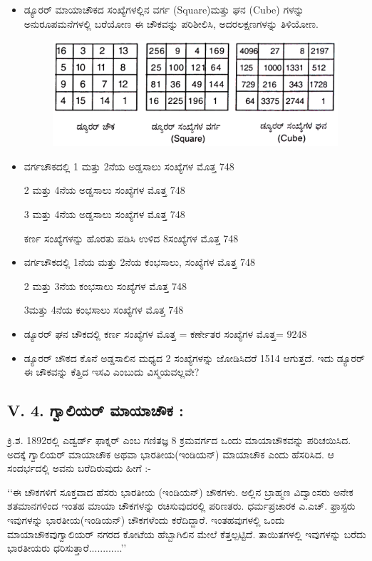 \begin{itemize}
	\item ಡ್ಯೂರರ್ ಮಾಯಾಚೌಕದ ಸಂಖ್ಯೆಗಳಲ್ಲಿನ ವರ್ಗ (Square)ಮತ್ತು ಘನ (Cube) ಗಳನ್ನು ಅನುರೂಪಮನೆಗಳಲ್ಲಿ ಬರೆಯೋಣ
	ಈ ಚೌಕವನ್ನು ಪರಿಶೀಲಿಸಿ, ಅದರ\break ಲಕ್ಷಣಗಳನ್ನು ತಿಳಿಯೋಣ.
	\begin{figure}[H]
	\includegraphics[scale=.8]{src/figures/chap4/fig4.20.jpg}
	\end{figure}

	\item ವರ್ಗಚೌಕದಲ್ಲಿ 1 ಮತ್ತು 2ನೆಯ ಅಡ್ಡಸಾಲು ಸಂಖ್ಯೆಗಳ ಮೊತ್ತ 748

	2 ಮತ್ತು 4ನೆಯ ಅಡ್ಡಸಾಲು ಸಂಖ್ಯೆಗಳ ಮೊತ್ತ 748

	3 ಮತ್ತು 4ನೆಯ ಅಡ್ಡಸಾಲು ಸಂಖ್ಯೆಗಳ ಮೊತ್ತ 748

	ಕರ್ಣ ಸಂಖ್ಯೆಗಳನ್ನು ಹೊರತು ಪಡಿಸಿ ಉಳಿದ 8ಸಂಖ್ಯೆಗಳ ಮೊತ್ತ 748
	
	\item ವರ್ಗಚೌಕದಲ್ಲಿ 1ನೆಯ ಮತ್ತು 2ನೆಯ ಕಂಭಸಾಲು, ಸಂಖ್ಯೆಗಳ ಮೊತ್ತ 748

	2 ಮತ್ತು 3ನೆಯ ಕಂಭಸಾಲು ಸಂಖ್ಯೆಗಳ ಮೊತ್ತ 748

	3ಮತ್ತು 4ನೆಯ ಕಂಭಸಾಲು ಸಂಖ್ಯೆಗಳ ಮೊತ್ತ 748
	\item ಡ್ಯೂರರ್ ಘನ ಚೌಕದಲ್ಲಿ ಕರ್ಣ ಸಂಖ್ಯೆಗಳ ಮೊತ್ತ = ಕರ್ಣೇತರ ಸಂಖ್ಯೆಗಳ ಮೊತ್ತ= 9248

	\item ಡ್ಯೂರರ್ ಚೌಕದ ಕೊನೆ ಅಡ್ಡಸಾಲಿನ ಮಧ್ಯದ 2 ಸಂಖ್ಯೆಗಳನ್ನು ಜೋಡಿಸಿದರೆ 1514 ಆಗುತ್ತದೆ. ಇದು ಡ್ಯೂರರ್ ಈ ಚೌಕವನ್ನು ಕೆತ್ತಿದ ಇಸವಿ ಎಂಬುದು ವಿಸ್ಮಯ\-ವಲ್ಲವೇ?
\end{itemize}

\subsection*{V. 4. ಗ್ವಾಲಿಯರ್ ಮಾಯಾಚೌಕ :}

ಕ್ರಿ.ಶ. 1892ರಲ್ಲಿ ಎಡ್ವರ್ಡ್ ಫಾಕ್ನರ್ ಎಂಬ ಗಣಿತಜ್ಞ 8 ಕ್ರಮವರ್ಗದ ಒಂದು ಮಾಯಾಚೌಕ\-ವನ್ನು ಪರಿಚಯಿಸಿದ. ಅದಕ್ಕೆ ಗ್ವಾಲಿಯರ್ ಮಾಯಾಚೌಕ ಅಥವಾ ಭಾರತೀಯ(ಇಂಡಿಯನ್) ಮಾಯಾಚೌಕ ಎಂದು ಹೆಸರಿಸಿದ. ಆ ಸಂದರ್ಭದಲ್ಲಿ ಅವನು ಬರೆದಿರುವುದು ಹೀಗೆ :-

‘‘ಈ ಚೌಕಗಳಿಗೆ ಸೂಕ್ತವಾದ ಹೆಸರು ಭಾರತೀಯ (ಇಂಡಿಯನ್) ಚೌಕಗಳು. ಅಲ್ಲಿನ ಬ್ರಾಹ್ಮಣ ವಿದ್ವಾಂಸರು ಅನೇಕ ಶತಮಾನಗಳಿಂದ ಇಂತಹ ಮಾಯಾ ಚೌಕಗಳನ್ನು ರಚಿಸು\-ವುದರಲ್ಲಿ ಪರಿಣತರು. ಧರ್ಮಪ್ರಚಾರಕ ಎ.ಎಚ್. ಫ್ರಾಸ್ಟರು ಇವುಗಳನ್ನು ಭಾರತೀಯ\break (ಇಂಡಿಯನ್) ಚೌಕಗಳೆಂದು ಕರೆದಿದ್ದಾರೆ. ಇಂತಹವುಗಳಲ್ಲಿ ಒಂದು ಮಾಯಾಚೌಕವು\break ಗ್ವಾಲಿಯರ್ ನಗರದ ಕೋಟೆಯ ಹೆಬ್ಬಾಗಿಲಿನ ಮೇಲೆ ಕೆತ್ತಲ್ಪಟ್ಟಿದೆ. ತಾಯಿತಗಳಲ್ಲಿ ಇವುಗಳನ್ನು\- ಬರೆದು ಭಾರತೀಯರು ಧರಿಸುತ್ತಾರೆ............’’

